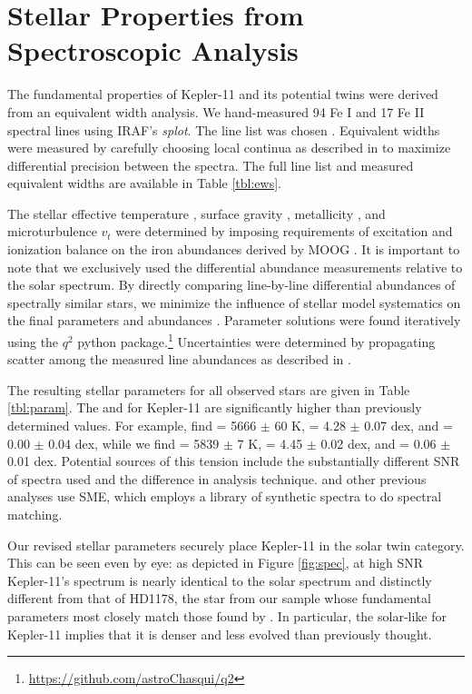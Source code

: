 \documentclass[oneside]{emulateapj}
\begin{document}

\section{Stellar Properties from Spectroscopic Analysis}

The fundamental properties of Kepler-11 and its potential twins were derived from an equivalent width analysis. We hand-measured 94 Fe I and 17 Fe II spectral lines using IRAF's \textit{splot}. The line list was chosen . Equivalent widths were measured by carefully choosing local continua as described in \citet{Bedell2014} to maximize differential precision between the spectra. The full line list and measured equivalent widths are available in Table \ref{tbl:ews}.

The stellar effective temperature \teff, surface gravity \logg, metallicity \feh, and microturbulence $v_t$ were determined by imposing requirements of excitation and ionization balance on the iron abundances derived by MOOG \citep{Sneden1973}. It is important to note that we exclusively used the differential abundance measurements relative to the solar spectrum. By directly comparing line-by-line differential abundances of spectrally similar stars, we minimize the influence of stellar model systematics on the final parameters and abundances \citep[see e.g.][]{Ramirez2014}. Parameter solutions were found iteratively using the $q^2$ python package.\footnote{\url{https://github.com/astroChasqui/q2}} Uncertainties were determined by propagating scatter among the measured line abundances as described in \citet{Epstein2010, Bensby2014}.

The resulting stellar parameters for all observed stars are given in Table \ref{tbl:param}. The \teff and \logg for Kepler-11 are significantly higher than previously determined values. For example, \citet{Lissauer2013} find \teff = 5666 $\pm$ 60 K, \logg = 4.28 $\pm$ 0.07 dex, and \feh = 0.00 $\pm$ 0.04 dex, while we find \teff = 5839 $\pm$ 7 K, \logg = 4.45 $\pm$ 0.02 dex, and \feh = 0.06 $\pm$ 0.01 dex. Potential sources of this tension include the substantially different SNR of spectra used and the difference in analysis technique. \citet{Lissauer2013} and other previous analyses use SME, which employs a library of synthetic spectra to do spectral matching. 

Our revised stellar parameters securely place Kepler-11 in the solar twin category. This can be seen even by eye: as depicted in Figure \ref{fig:spec}, at high SNR Kepler-11's spectrum is nearly identical to the solar spectrum and distinctly different from that of HD1178, the star from our sample whose fundamental parameters most closely match those found by \citet{Lissauer2013}. In particular, the solar-like \logg for Kepler-11 implies that it is denser and less evolved than previously thought.
\end{document}
